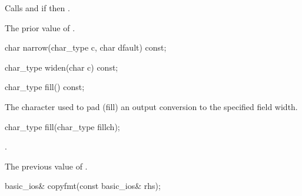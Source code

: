 \begin{itemdescr}
\pnum
\effects
Calls
and
if
then
.

\pnum
\returns
The prior value of
.
\end{itemdescr}

%
\begin{itemdecl}
char narrow(char_type c, char dfault) const;
\end{itemdecl}

\begin{itemdescr}
\pnum
\returns
{}
\end{itemdescr}

%
\begin{itemdecl}
char_type widen(char c) const;
\end{itemdecl}

\begin{itemdescr}
\pnum
\returns
{}
\end{itemdescr}

%
\begin{itemdecl}
char_type fill() const;
\end{itemdecl}

\begin{itemdescr}
\pnum
\returns
The character used to pad (fill) an output conversion to the specified
field width.
\end{itemdescr}

%
\begin{itemdecl}
char_type fill(char_type fillch);
\end{itemdecl}

\begin{itemdescr}
\pnum
\ensures
{}.

\pnum
\returns
The previous value of
.
\end{itemdescr}

%
\begin{itemdecl}
basic_ios& copyfmt(const basic_ios& rhs);
\end{itemdecl}


